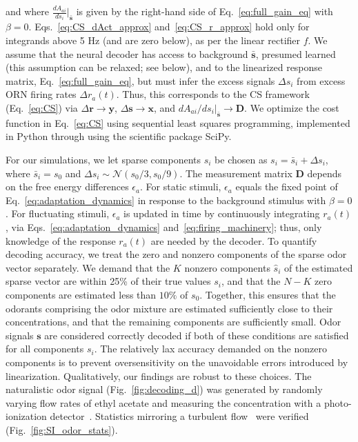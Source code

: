 \documentclass[10pt,prl,aps,showpacs,twocolumn,unsortedaddress,showkeys,linenumbers]{revtex4-1}
\begin{document}
and where $\frac{dA_{ai}}{ds_i}\big|_{\bar{\mathbf s}}$ is given by the right-hand side of Eq.~\ref{eq:full_gain_eq} with $\beta = 0$. Eqs.~\ref{eq:CS_dAct_approx} and~\ref{eq:CS_r_approx} hold only for integrands above 5 Hz (and are zero below), as per the linear rectifier $f$. We assume that the neural decoder has access to background $\bar{\mathbf s}$, presumed learned (this assumption can be relaxed; see below), and to  the linearized response matrix, Eq.~\ref{eq:full_gain_eq}, but must infer the excess signals $\Delta s_i$ from excess ORN firing rates $\Delta r_a(t)$. Thus, this corresponds to the CS framework (Eq.~\ref{eq:CS})  via $\Delta \mathbf {r} \rightarrow \mathbf y$, $\Delta \mathbf s \rightarrow \mathbf x$, and $dA_{ai}/{ds_i}\big|_{\bar {\mathbf s}} \rightarrow \mathbf D$. We optimize the cost function in Eq.~\ref{eq:CS} using sequential least squares programming, implemented in Python through using the scientific package SciPy. 



For our simulations, we let sparse components $s_i$ be chosen as $s_i = \bar s_i + \Delta s_i$, where $\bar s_i= s_0$ and $\Delta s_i \sim \mathcal {N} (s_0/3, s_0/9)$. The measurement matrix $\mathbf D$ depends on the free energy differences $\epsilon_a$. For static stimuli, $\epsilon_a$ equals the fixed point of Eq.~\ref{eq:adaptation_dynamics} in response to the background stimulus with $\beta = 0$. For fluctuating stimuli, $\epsilon_a$ is updated in time by continuously integrating  $r_a(t)$, via Eqs.~\ref{eq:adaptation_dynamics} and~\ref{eq:firing_machinery}; thus, only knowledge of the response $r_a(t)$ are needed by the decoder. 
{\color {blue} 
To quantify decoding accuracy, we treat the zero and nonzero components of the sparse odor vector separately. We demand that the $K$ nonzero components $\hat s_i$ of the estimated sparse vector are within 25\% of their true values $s_i$, and that the $N - K$ zero components are estimated less than $10\%$ of $s_0$. Together, this ensures that the odorants comprising the odor mixture are estimated sufficiently close to their concentrations, and that the remaining components are sufficiently small. Odor signals $\mathbf s$ are considered correctly decoded if both of these conditions are satisfied for all components $s_i$. The relatively lax accuracy demanded on the nonzero components is to prevent oversensitivity on the unavoidable errors introduced by linearization. Qualitatively, our findings are robust to these choices. 
}
The naturalistic odor signal (Fig.~\ref{fig:decoding_d}) was generated by randomly varying flow rates of ethyl acetate and measuring the concentration with a photo-ionization detector~\cite{srinivas_elife}. Statistics mirroring a turbulent flow~\cite{celani} were verified (Fig.~\ref{fig:SI_odor_stats}). \\
\end{document}
